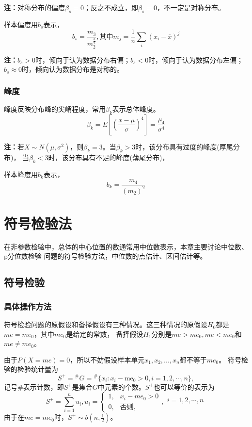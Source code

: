 \documentclass[lang=cn,10pt]{elegantbook}
\begin{document}
\textbf{注：}对称分布的偏度$\beta_s=0$；反之不成立，即$\beta_s=0$，不一定是对称分布。

样本偏度用$b_s$表示，
\begin{equation}
    b_s=\frac{m_3}{m_2^{\frac{3}{2}}},\text{其中}m_j=\frac{1}{n}\sum_i(x_i-\overline{x})^j
\end{equation}

\textbf{注：}$b_s>0$时，倾向于认为数据分布右偏；$b_s<0$时，倾向于认为数据分布左偏；
$b_s\approx 0$时，倾向认为数据分布是对称的。

\subsection{峰度}
峰度反映分布峰的尖峭程度，常用$\beta_k$表示总体峰度。
\begin{equation}
    \beta_k=E[(\frac{x-\mu}{\sigma})^4]=\frac{\mu_4}{\sigma^4}
\end{equation}

\textbf{注：}若$X\sim N(\mu,\sigma^2)$，则$\beta_k=3$。当$\beta_k>3$时，该分布具有过度的峰度(厚尾分布)，
当$\beta_k<3$时，该分布具有不足的峰度(薄尾分布)，

样本峰度用$b_k$表示，
\begin{equation}
    b_k=\frac{m_4}{(m_2)^2}
\end{equation}

\chapter{符号检验法}
在非参数检验中，总体的中心位置的数通常用中位数表示，本章主要讨论中位数、p分位数检验
问题的符号检验方法，中位数的点估计、区间估计等。
\section{符号检验}
\subsection{具体操作方法}
符号检验问题的原假设和备择假设有三种情况。这三种情况的原假设$H_0$都是$me = me_0$，其中$me_0$是给定的常数，
备择假设$H_1$分别是$me>me_0,me<me_0$和$me \ne me_0$。

由于$P(X=me)=0$，所以不妨假设样本单元$x_1,x_2,...,x_n$都不等于$me_0$。
符号检验的检验统计量为
\begin{equation}
    S^+ ={}^{\#}G= {}^{\#}\{x_i:x_i-\text{me}_0>0,i=1,2,\cdots,n\},
\end{equation}
记号\#表示计数，即$S^+$是集合$G$中元素的个数。$S^+$也可以等价的表示为
\begin{equation}
    S^+=\sum_{i=1}^nu_i,u_i=
    \begin{cases}
        1, & x_i-me_0>0   \\
        0, & \text{否则,}
    \end{cases},{\begin{array}{c}
                i=1,2,\cdots,n \\
            \end{array}}
\end{equation}
由于在$me = me_0$时，$S^+\sim b(n,\frac12)$。
\end{document}
